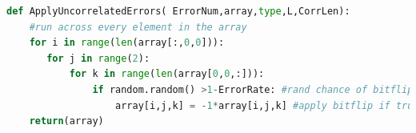 		\begin{lstlisting}[language=Python, caption=Applying Uncorrelated Errors, label = code:applyerrors]
def ApplyUncorrelatedErrors( ErrorNum,array,type,L,CorrLen):
	#run across every element in the array
	for i in range(len(array[:,0,0])):
	   for j in range(2):
	       for k in range(len(array[0,0,:])):
	           if random.random() >1-ErrorRate: #rand chance of bitflip
	               array[i,j,k] = -1*array[i,j,k] #apply bitflip if true
	return(array)
		\end{lstlisting}


